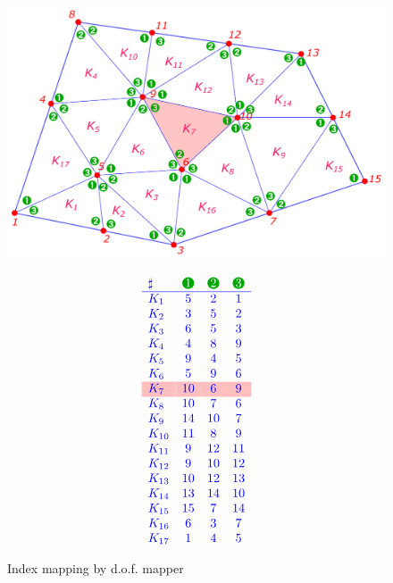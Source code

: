 	\begin{figure}[!htbp]
		\centering
		\hspace{.03\textwidth}%
		\begin{minipage}{0.7\textwidth}
			\centering
			\includegraphics[width=\linewidth]{
				svg/2D_index_mapping_by_dof_mapper}
		\end{minipage}%
		\begin{minipage}{0.27\textwidth}
			\centering
			\[\textcolor{blue}{\begin{array}{lccc}
				\sharp & \greencircled{1} & \greencircled{2} & 
				\greencircled{3} \\ \hline
				K_1  & 5  & 2  & 1\\
				K_2  & 3  & 5  & 2\\
				K_3  & 6  & 5  & 3\\
				K_4  & 4  & 8  & 9\\
				K_5  & 9  & 4  & 5\\
				K_6  & 5  & 9  & 6\\
				\rowcolor{pink} K_7  & 10 & 6  & 9\\
				K_8  & 10 & 7  & 6\\
				K_9  & 14 & 10 & 7\\
				K_{10} & 11 & 8  & 9\\
				K_{11} & 9  & 12 & 11\\
				K_{12} & 9  & 10 & 12\\
				K_{13} & 10 & 12 & 13\\
				K_{14} & 13 & 14 & 10\\
				K_{15} & 15 & 7  & 14\\
				K_{16} & 6  & 3  & 7\\
				K_{17} & 1  & 4  & 5
			\end{array}}\]
		\end{minipage}
		\caption{Index mapping by d.o.f. mapper}
		\label{fig:2D_index_mapping_by_dof_mapper}
	\end{figure}

